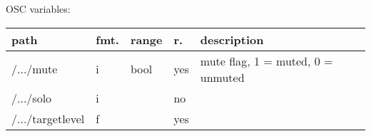 \begin{snugshade}
{\footnotesize
\label{osctab:routet}
OSC variables:
\nopagebreak

\begin{tabularx}{\textwidth}{llllX}
\hline
path & fmt. & range & r. & description\\
\hline
/.../mute & i & bool & yes & mute flag, 1 = muted, 0 = unmuted\\
/.../solo & i &  & no & \\
/.../targetlevel & f &  & yes & \\
\hline
\end{tabularx}
}
\end{snugshade}
